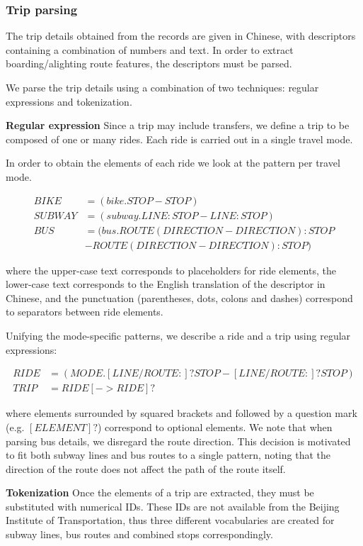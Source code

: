 \documentclass{article}
\begin{document}
\subsubsection{Trip parsing} 
\label{sec:tripParsing}
The trip details obtained from the records are given in Chinese, with descriptors containing a combination of numbers and text. In order to extract boarding/alighting route features, the descriptors must be parsed. 

We parse the trip details using a combination of two techniques: regular expressions and tokenization. 

\textbf{Regular expression}
Since a trip may include transfers, we define a trip to be composed of one or many rides. Each ride is carried out in a single travel mode. 

In order to obtain the elements of each ride we look at the pattern per travel mode.

    \begin{align*}
    BIKE &= (bike.STOP-STOP) \\
    SUBWAY &= (subway.LINE:STOP-LINE:STOP) \\
    BUS &= (bus.ROUTE(DIRECTION-DIRECTION):STOP \\
    &-ROUTE(DIRECTION-DIRECTION):STOP)
	\end{align*}
	
where the upper-case text corresponds to placeholders for ride elements, the lower-case text corresponds to the English translation of the descriptor in Chinese, and the punctuation (parentheses, dots, colons and dashes) correspond to separators between ride elements.

Unifying the mode-specific patterns, we describe a ride and a trip using regular expressions:
    
	\begin{align*}	        
    RIDE &= (MODE.[LINE/ROUTE:]?STOP-[LINE/ROUTE:]?STOP) \\
    TRIP &= RIDE[->RIDE]? 
	\end{align*}    
	
where elements surrounded by squared brackets and followed by a question mark (e.g. $[ELEMENT]?$) correspond to optional elements. We note that when parsing bus details, we disregard the route direction. This decision is motivated to fit both subway lines and bus routes to a single pattern, noting that the direction of the route does not affect the path of the route itself.

\textbf{Tokenization}
Once the elements of a trip are extracted, they must be substituted with numerical IDs. These IDs are not available from the Beijing Institute of Transportation, thus three different vocabularies are created for subway lines, bus routes and combined stops correspondingly. 
\end{document}
